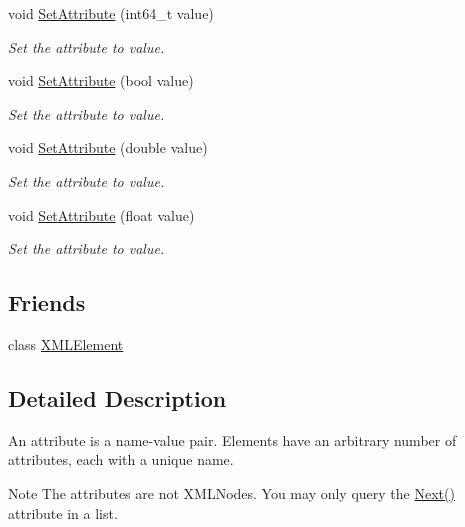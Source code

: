 \begin{DoxyCompactItemize}
void \hyperlink{classtinyxml2_1_1_x_m_l_attribute_a7c1240f479722b9aa29b6c030aa116c2}{Set\+Attribute} (int64\+\_\+t value)
\begin{DoxyCompactList}\small\item\em Set the attribute to value. \end{DoxyCompactList}\item 
void \hyperlink{classtinyxml2_1_1_x_m_l_attribute_ab3516def4fe058fe328f2b89fc2d77da}{Set\+Attribute} (bool value)
\begin{DoxyCompactList}\small\item\em Set the attribute to value. \end{DoxyCompactList}\item 
void \hyperlink{classtinyxml2_1_1_x_m_l_attribute_a9a65ab3147abe8ccbbd373ce8791e818}{Set\+Attribute} (double value)
\begin{DoxyCompactList}\small\item\em Set the attribute to value. \end{DoxyCompactList}\item 
void \hyperlink{classtinyxml2_1_1_x_m_l_attribute_ae95e843313aaf5d56c32530b6456df02}{Set\+Attribute} (float value)
\begin{DoxyCompactList}\small\item\em Set the attribute to value. \end{DoxyCompactList}\end{DoxyCompactItemize}
\subsection*{Friends}
\begin{DoxyCompactItemize}
\item 
class \hyperlink{classtinyxml2_1_1_x_m_l_attribute_ac2fba9b6e452829dd892f7392c24e0eb}{X\+M\+L\+Element}
\end{DoxyCompactItemize}


\subsection{Detailed Description}
An attribute is a name-\/value pair. Elements have an arbitrary number of attributes, each with a unique name.

\begin{DoxyNote}{Note}
The attributes are not X\+M\+L\+Nodes. You may only query the \hyperlink{classtinyxml2_1_1_x_m_l_attribute_aee53571b21e7ce5421eb929523a8bbe6}{Next()} attribute in a list. 
\end{DoxyNote}


